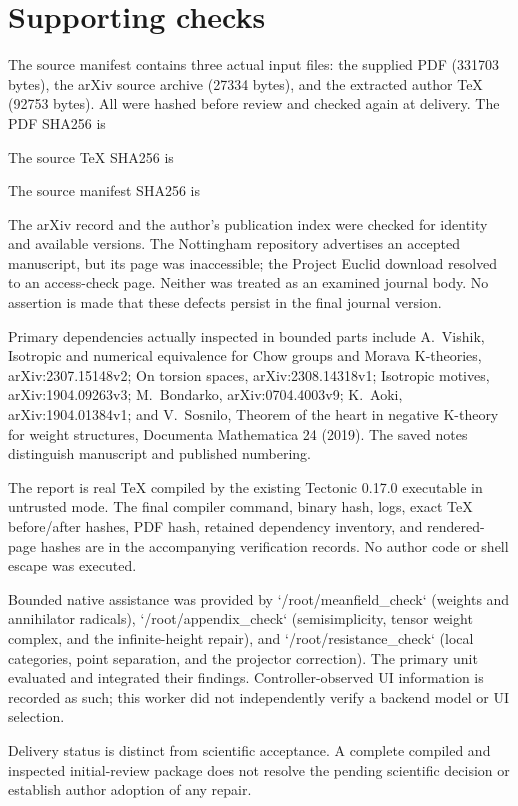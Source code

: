 \documentclass[10pt]{article}
\begin{document}
\section*{Supporting checks}
The source manifest contains three actual input files: the supplied PDF (331703 bytes), the arXiv source archive (27334 bytes), and the extracted author TeX (92753 bytes). All were hashed before review and checked again at delivery. The PDF SHA256 is\par
The source TeX SHA256 is\par
The source manifest SHA256 is\par
The arXiv record and the author’s publication index were checked for identity and available versions. The Nottingham repository advertises an accepted manuscript, but its page was inaccessible; the Project Euclid download resolved to an access-check page. Neither was treated as an examined journal body. No assertion is made that these defects persist in the final journal version.\par
Primary dependencies actually inspected in bounded parts include A. Vishik, Isotropic and numerical equivalence for Chow groups and Morava K-theories, arXiv:2307.15148v2; On torsion spaces, arXiv:2308.14318v1; Isotropic motives, arXiv:1904.09263v3; M. Bondarko, arXiv:0704.4003v9; K. Aoki, arXiv:1904.01384v1; and V. Sosnilo, Theorem of the heart in negative K-theory for weight structures, Documenta Mathematica 24 (2019). The saved notes distinguish manuscript and published numbering.\par
The report is real TeX compiled by the existing Tectonic 0.17.0 executable in untrusted mode. The final compiler command, binary hash, logs, exact TeX before/after hashes, PDF hash, retained dependency inventory, and rendered-page hashes are in the accompanying verification records. No author code or shell escape was executed.\par
Bounded native assistance was provided by `/root/meanfield\_check` (weights and annihilator radicals), `/root/appendix\_check` (semisimplicity, tensor weight complex, and the infinite-height repair), and `/root/resistance\_check` (local categories, point separation, and the projector correction). The primary unit evaluated and integrated their findings. Controller-observed UI information is recorded as such; this worker did not independently verify a backend model or UI selection.\par
Delivery status is distinct from scientific acceptance. A complete compiled and inspected initial-review package does not resolve the pending scientific decision or establish author adoption of any repair.\par
\end{document}
